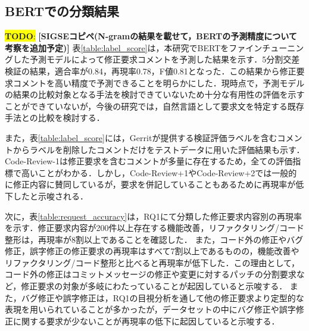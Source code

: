 \documentclass[11pt]{jreport}
\newcommand{\todo}[1]{\colorbox{yellow}{{\bf TODO}:}{\color{red} {\textbf{[#1]}}}}
\begin{document}
\subsection{BERTでの分類結果}

\todo{SIGSEコピペ(N-gramの結果を載せて，BERTの予測精度について考察を追加予定)}
表\ref{table:label_score}は，本研究でBERTをファインチューニングした予測モデルによって修正要求コメントを予測した結果を示す．5分割交差検証の結果，適合率が0.84，再現率0.78，F値0.81となった．この結果から修正要求コメントを高い精度で予測できることを明らかにした．現時点で，予測モデルの結果の比較対象となる手法を検討できていないため十分な有用性の評価を示すことができていないが，今後の研究では，自然言語として要求文を特定する既存手法との比較を検討する．

また，表\ref{table:label_score}には，Gerritが提供する検証評価ラベルを含むコメントからラベルを削除したコメントだけをテストデータに用いた評価結果も示す．Code-Review-1は修正要求を含むコメントが多量に存在するため，全ての評価指標で高いことがわかる．しかし，Code-Review+1やCode-Review+2では一般的に修正内容に賛同しているが，要求を併記していることもあるために再現率が低下したと示唆される．

\begin{table}[t]
\centering
  \caption{修正要求コメントの予測精度}
  \label{table:label_score}
\end{table}

次に，表\ref{table:request_accuracy}は，RQ1にて分類した修正要求内容別の再現率を示す．修正要求内容が200件以上存在する機能改善，リファクタリング/コード整形は，再現率が8割以上であることを確認した．
また，コード外の修正やバグ修正，誤字修正の修正要求の再現率はすべて7割以上であるものの，機能改善やリファクタリング/コード整形と比べると再現率が低下した．この理由として，コード外の修正はコミットメッセージの修正や変更に対するパッチの分割要求など，修正要求の対象が多岐にわたっていることが起因していると示唆する．
また，バグ修正や誤字修正は，RQ1の目視分析を通して他の修正要求より定型的な表現を用いられていることが多かったが，データセットの中にバグ修正や誤字修正に関する要求が少ないことが再現率の低下に起因していると示唆する．
\end{document}
